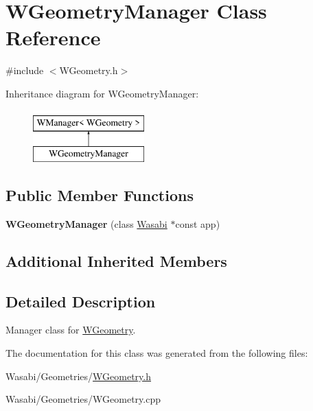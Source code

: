 \hypertarget{class_w_geometry_manager}{}\section{W\+Geometry\+Manager Class Reference}
\label{class_w_geometry_manager}


{\ttfamily \#include $<$W\+Geometry.\+h$>$}

Inheritance diagram for W\+Geometry\+Manager\+:\begin{figure}[H]
\begin{center}
\leavevmode
\includegraphics[height=2.000000cm]{class_w_geometry_manager}
\end{center}
\end{figure}
\subsection*{Public Member Functions}
\begin{DoxyCompactItemize}
\item 
{\bfseries W\+Geometry\+Manager} (class \hyperlink{class_wasabi}{Wasabi} $\ast$const app)\hypertarget{class_w_geometry_manager_aef4630cbfd7630f985091615f8e4a7f3}{}\label{class_w_geometry_manager_aef4630cbfd7630f985091615f8e4a7f3}

\end{DoxyCompactItemize}
\subsection*{Additional Inherited Members}


\subsection{Detailed Description}
Manager class for \hyperlink{class_w_geometry}{W\+Geometry}. 

The documentation for this class was generated from the following files\+:\begin{DoxyCompactItemize}
\item 
Wasabi/\+Geometries/\hyperlink{_w_geometry_8h}{W\+Geometry.\+h}\item 
Wasabi/\+Geometries/W\+Geometry.\+cpp\end{DoxyCompactItemize}
